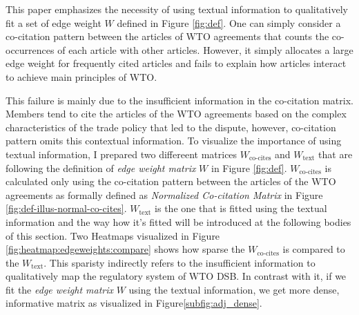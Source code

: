 This paper emphasizes the necessity of using textual information 
to qualitatively fit a set of edge weight $W$ defined in Figure \ref{fig:def}. %
One can simply consider a co-citation pattern between the articles of WTO agreements that counts the co-occurrences of each article with other articles. However,
it simply allocates a large edge weight for frequently cited articles and fails to explain how articles interact to achieve main principles of WTO. %

This failure is mainly due to the insufficient information in the co-citation matrix. Members tend to cite the articles of 
the WTO agreements based on the complex characteristics of 
the trade policy that led to the dispute, however, co-citation pattern omits this contextual information. To visualize the importance of using textual information, I prepared two differeent matrices $W_{\text{co-cites}}$ and $W_{\text{text}}$ that are following the definition of \textit{edge weight matrix} $W$ in Figure \ref{fig:def}.
$W_{\text{co-cites}}$ is calculated only using the co-citation pattern between the articles of the WTO agreements as formally defined as \textit{Normalized Co-citation Matrix} in Figure \ref{fig:def-illus-normal-co-cites}. 
$W_{\text{text}}$ is the one that is fitted using the textual information and the way how it's fitted will be introduced at the following bodies of this section.
Two Heatmaps visualized in Figure \ref{fig:heatmap:edgeweights:compare} shows how sparse the $W_{\text{co-cites}}$ is compared to the $W_{\text{text}}$. This sparisty indirectly refers to the insufficient information
to qualitatively map the regulatory system of WTO DSB. 
In contrast with it, if we fit the \textit{edge weight matrix} $W$ using the textual information, we get more dense, informative matrix as visualized in Figure\ref{subfig:adj_dense}.





